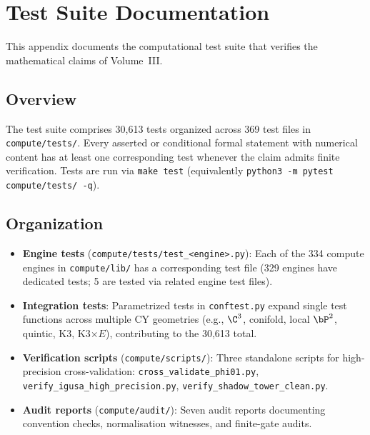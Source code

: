 \chapter{Test Suite Documentation}
\label{app:tests}

This appendix documents the computational test suite that verifies the
mathematical claims of Volume~III.

\section{Overview}
\label{sec:test-overview}

The test suite comprises 30,613 tests organized across 369 test files in
\texttt{compute/tests/}. Every asserted or conditional formal statement
with numerical content has at least one corresponding test whenever the
claim admits finite verification. Tests are run via \texttt{make test}
(equivalently
\texttt{python3 -m pytest compute/tests/ -q}).

\section{Organization}
\label{sec:test-organization}

\begin{itemize}[nosep]
\item \textbf{Engine tests} (\texttt{compute/tests/test\_<engine>.py}):
 Each of the 334 compute engines in \texttt{compute/lib/} has a
 corresponding test file (329 engines have dedicated tests; 5 are
 tested via related engine test files).

\item \textbf{Integration tests}: Parametrized tests in
 \texttt{conftest.py} expand single test functions across multiple CY
 geometries (e.g., $\C^3$, conifold, local $\bP^2$, quintic, K3,
 K3$\times E$), contributing to the 30,613 total.

\item \textbf{Verification scripts} (\texttt{compute/scripts/}):
 Three standalone scripts for high-precision cross-validation:
 \texttt{cross\_validate\_phi01.py},
 \texttt{verify\_igusa\_high\_precision.py},
 \texttt{verify\_shadow\_tower\_clean.py}.

\item \textbf{Audit reports} (\texttt{compute/audit/}): Seven audit
 reports documenting convention checks, normalisation witnesses, and
 finite-gate audits.
\end{itemize}

